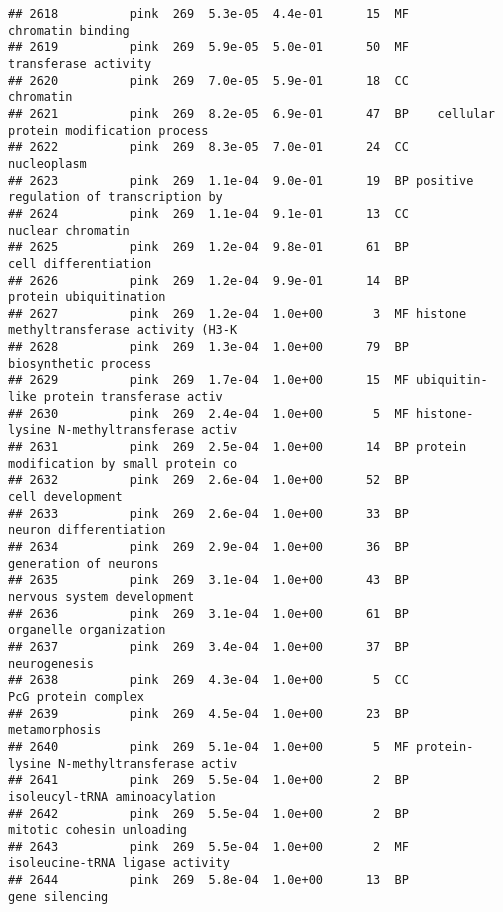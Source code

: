 \documentclass[]{article}
\begin{document}
\begin{verbatim}
## 2618          pink  269  5.3e-05  4.4e-01      15  MF                        chromatin binding
## 2619          pink  269  5.9e-05  5.0e-01      50  MF                     transferase activity
## 2620          pink  269  7.0e-05  5.9e-01      18  CC                                chromatin
## 2621          pink  269  8.2e-05  6.9e-01      47  BP    cellular protein modification process
## 2622          pink  269  8.3e-05  7.0e-01      24  CC                              nucleoplasm
## 2623          pink  269  1.1e-04  9.0e-01      19  BP positive regulation of transcription by 
## 2624          pink  269  1.1e-04  9.1e-01      13  CC                        nuclear chromatin
## 2625          pink  269  1.2e-04  9.8e-01      61  BP                     cell differentiation
## 2626          pink  269  1.2e-04  9.9e-01      14  BP                   protein ubiquitination
## 2627          pink  269  1.2e-04  1.0e+00       3  MF histone methyltransferase activity (H3-K
## 2628          pink  269  1.3e-04  1.0e+00      79  BP                     biosynthetic process
## 2629          pink  269  1.7e-04  1.0e+00      15  MF ubiquitin-like protein transferase activ
## 2630          pink  269  2.4e-04  1.0e+00       5  MF histone-lysine N-methyltransferase activ
## 2631          pink  269  2.5e-04  1.0e+00      14  BP protein modification by small protein co
## 2632          pink  269  2.6e-04  1.0e+00      52  BP                         cell development
## 2633          pink  269  2.6e-04  1.0e+00      33  BP                   neuron differentiation
## 2634          pink  269  2.9e-04  1.0e+00      36  BP                    generation of neurons
## 2635          pink  269  3.1e-04  1.0e+00      43  BP               nervous system development
## 2636          pink  269  3.1e-04  1.0e+00      61  BP                   organelle organization
## 2637          pink  269  3.4e-04  1.0e+00      37  BP                             neurogenesis
## 2638          pink  269  4.3e-04  1.0e+00       5  CC                      PcG protein complex
## 2639          pink  269  4.5e-04  1.0e+00      23  BP                            metamorphosis
## 2640          pink  269  5.1e-04  1.0e+00       5  MF protein-lysine N-methyltransferase activ
## 2641          pink  269  5.5e-04  1.0e+00       2  BP            isoleucyl-tRNA aminoacylation
## 2642          pink  269  5.5e-04  1.0e+00       2  BP                mitotic cohesin unloading
## 2643          pink  269  5.5e-04  1.0e+00       2  MF          isoleucine-tRNA ligase activity
## 2644          pink  269  5.8e-04  1.0e+00      13  BP                           gene silencing

\end{verbatim}
\end{document}
